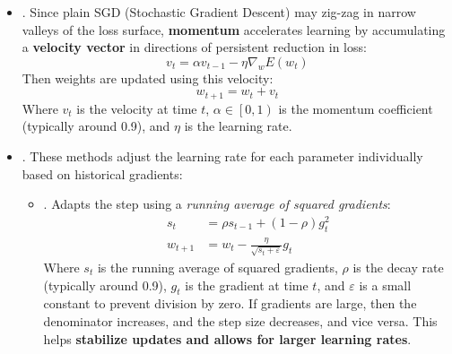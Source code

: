 \begin{itemize}
\begin{itemize}
        \item {}: vary $\eta$ according to a cosine function:
        \begin{equation}
            \eta_t = \dfrac{\eta_0}{2} \cdot \left(1 + \cos\left(\frac{t}{T} \pi\right)\right)
        \end{equation}
        Where $T$ is the maximum number of epochs. This allows for periodic ``\emph{restarts}'' of the learning rate, because the cosine function oscillates (i.e., the interval $[0, \pi]$ can be repeated multiple times during training).
    \end{itemize}
    In practice, \textbf{learning rate is set to a relatively high value} initially to allow for \hl{rapid learning}, and then \textbf{gradually decreased} to allow for \hl{fine-tuning} as training progresses.


    \item {}. Since plain SGD (Stochastic Gradient Descent) may zig-zag in narrow valleys of the loss surface, \textbf{momentum} accelerates learning by accumulating a \textbf{velocity vector} in directions of persistent reduction in loss:
    \begin{equation}
        v_t = \alpha v_{t-1} - \eta \nabla_w E\left(w_t\right)
    \end{equation}
    Then weights are updated using this velocity:
    \begin{equation}
        w_{t+1} = w_t + v_t
    \end{equation}
    Where $v_t$ is the velocity at time $t$, $\alpha \in \left[0, 1\right)$ is the momentum coefficient (typically around 0.9), and $\eta$ is the learning rate.


    \item {}. These methods adjust the learning rate for each parameter individually based on historical gradients:
    \begin{itemize}
        \item {}. Adapts the step using a \emph{running average of squared gradients}:
        \begin{equation}
            \begin{aligned}
                s_t &= \rho s_{t-1} + (1 - \rho) g_t^2 \\[.3em]
                w_{t+1} &= w_t - \frac{\eta}{\sqrt{s_t + \varepsilon}} g_t
            \end{aligned}
        \end{equation}
        Where $s_t$ is the running average of squared gradients, $\rho$ is the decay rate (typically around 0.9), $g_t$ is the gradient at time $t$, and $\varepsilon$ is a small constant to prevent division by zero. If gradients are large, then the denominator increases, and the step size decreases, and vice versa. This helps \textbf{stabilize updates and allows for larger learning rates}.


\end{itemize}
\end{itemize}

